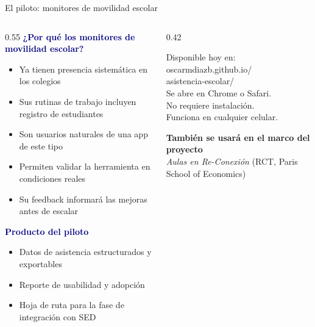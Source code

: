 \documentclass[aspectratio=169, 12pt]{beamer}
\begin{document}
\begin{frame}{El piloto: monitores de movilidad escolar}
\vspace{0.2cm}
\begin{columns}[T]
  \begin{column}{0.55\textwidth}
    \textbf{\textcolor{navy}{¿Por qué los monitores de movilidad escolar?}}\\[8pt]
    \begin{itemize}\setlength\itemsep{6pt}
      \item Ya tienen presencia sistemática en los colegios
      \item Sus rutinas de trabajo incluyen registro de estudiantes
      \item Son usuarios naturales de una app de este tipo
      \item Permiten validar la herramienta en condiciones reales
      \item Su feedback informará las mejoras antes de escalar
    \end{itemize}
    \vspace{10pt}
    \textbf{\textcolor{navy}{Producto del piloto}}\\[6pt]
    \begin{itemize}\setlength\itemsep{4pt}
      \item Datos de asistencia estructurados y exportables
      \item Reporte de usabilidad y adopción
      \item Hoja de ruta para la fase de integración con SED
    \end{itemize}
  \end{column}
  \begin{column}{0.42\textwidth}
    \begin{tcolorbox}[colback=azul!6, colframe=azul, arc=10pt,
      boxrule=1.5pt, title={\color{white}\bfseries Acceso al piloto},
      coltitle=white, colbacktitle=azul, halign=center]
      \vspace{4pt}
      {\small Disponible hoy en:}\\[4pt]
      {\footnotesize\ttfamily\color{navy}
        oscarmdiazb.github.io/\\asistencia-escolar/}\\[8pt]
      {\small\color{textgray} Se abre en Chrome o Safari.\\
       No requiere instalación.\\
       Funciona en cualquier celular.}
      \vspace{4pt}
    \end{tcolorbox}
    \vspace{8pt}
    \begin{tcolorbox}[colback=amarillo!15, colframe=amarillo, arc=8pt,
      boxrule=1pt, halign=center]
      {\small\bfseries También se usará en el marco del proyecto}\\[2pt]
      {\small\color{textgray} \textit{Aulas en Re-Conexión} (RCT, Paris School of Economics)}
    \end{tcolorbox}
  \end{column}
\end{columns}
\end{frame}
\end{document}
